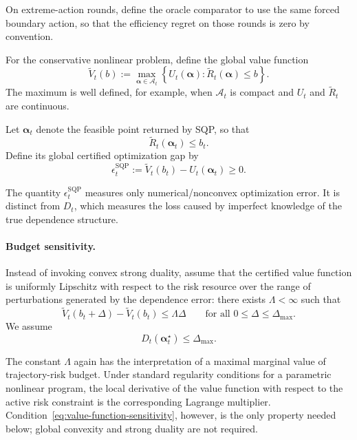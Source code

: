 \documentclass[11pt]{article}
\begin{document}
On extreme-action rounds, define the oracle comparator to use the same forced
boundary action, so that the efficiency regret on those rounds is zero by
convention.

For the conservative nonlinear problem, define the global value function
\begin{equation}
    \widetilde V_t(b)
    :=
    \max_{\bm\alpha\in\mathcal A_t}
    \left\{
        U_t(\bm\alpha):
        \widetilde R_t(\bm\alpha)\le b
    \right\}.
    \label{eq:certified-value-function}
\end{equation}
The maximum is well defined, for example, when $\mathcal A_t$ is compact and
$U_t$ and $\widetilde R_t$ are continuous.

Let $\bm\alpha_t$ denote the feasible point returned by SQP, so that
\begin{equation}
    \widetilde R_t(\bm\alpha_t)\le b_t.
    \label{eq:sqp-feasibility}
\end{equation}
Define its global certified optimization gap by
\begin{equation}
\boxed{
    \epsilon_t^{\mathrm{SQP}}
    :=
    \widetilde V_t(b_t)
    -
    U_t(\bm\alpha_t)
    \ge 0.
}
\label{eq:sqp-global-gap}
\end{equation}

The quantity $\epsilon_t^{\mathrm{SQP}}$ measures only numerical/nonconvex
optimization error.  It is distinct from $D_t$, which measures the loss caused
by imperfect knowledge of the true dependence structure.

\paragraph{Budget sensitivity.}
Instead of invoking convex strong duality, assume that the certified value
function is uniformly Lipschitz with respect to the risk resource over the
range of perturbations generated by the dependence error: there exists
$\Lambda<\infty$ such that
\begin{equation}
    \widetilde V_t(b_t+\Delta)
    -
    \widetilde V_t(b_t)
    \le
    \Lambda\Delta
    \qquad
    \text{for all }
    0\le\Delta\le\Delta_{\max}.
    \label{eq:value-function-sensitivity}
\end{equation}
We assume
\[
    D_t(\bm\alpha_t^\star)
    \le
    \Delta_{\max}.
\]

The constant $\Lambda$ again has the interpretation of a maximal marginal
value of trajectory-risk budget.  Under standard regularity conditions for a
parametric nonlinear program, the local derivative of the value function with
respect to the active risk constraint is the corresponding Lagrange
multiplier.  Condition~\eqref{eq:value-function-sensitivity}, however, is the
only property needed below; global convexity and strong duality are not
required.
\end{document}
